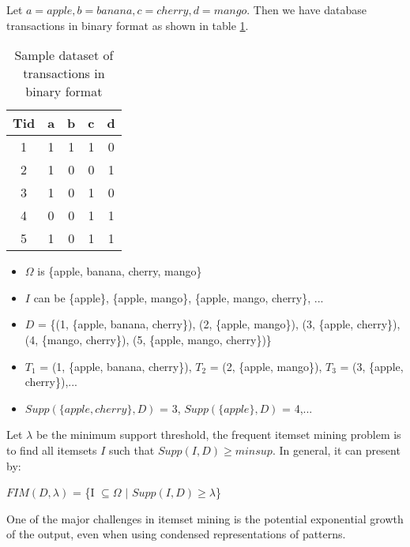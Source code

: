 Let $a = apple, b = banana, c = cherry, d = mango$.
Then we have database transactions in binary format as shown in table \ref{tab:example_dataset_convert_to_binary}.

\begin{table}[H]
    \centering
    \begin{tabular}{|c| c c c c |}
        \hline
        \textbf{Tid} & \textbf{a} & \textbf{b} & \textbf{c} & \textbf{d} \\
        \hline
        1            & 1          & 1          & 1          & 0          \\
        2            & 1          & 0          & 0          & 1          \\
        3            & 1          & 0          & 1          & 0          \\
        4            & 0          & 0          & 1          & 1          \\
        5            & 1          & 0          & 1          & 1          \\
        \hline
    \end{tabular}
    \caption{Sample dataset of transactions in binary format}
    \label{tab:example_dataset_convert_to_binary}
\end{table}

\begin{itemize}
    \item $\Omega$ is \{apple, banana, cherry, mango\}
    \item $I$ can be \{apple\}, \{apple, mango\}, \{apple, mango, cherry\}, ...
    \item $D$ = \{(1, \{apple, banana, cherry\}), (2, \{apple, mango\}), (3, \{apple, cherry\}), (4, \{mango, cherry\}), (5, \{apple, mango, cherry\})\}
    \item $T_1$ = (1, \{apple, banana, cherry\}), $T_2$ = (2, \{apple, mango\}), $T_3$ = (3, \{apple, cherry\}),...
    \item $Supp(\{apple, cherry\}, D)$ = 3, $Supp(\{apple\}, D)$ = 4,...
\end{itemize}
Let $\lambda$ be the minimum support threshold,
the frequent itemset mining problem is to find all itemsets $I$ such that $Supp(I, D) \geq minsup$. In general, it can present by:

\begin{center}
    $FIM(D,\lambda)$ = \{I $\subseteq \Omega$ $|$ $Supp(I, D) \geq \lambda$\}
\end{center}

One of the major challenges in itemset mining is the potential exponential growth of the output, even when using condensed representations of patterns.
